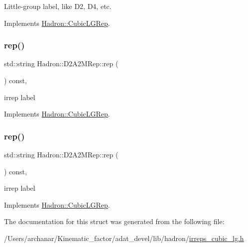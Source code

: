 Little-\/group label, like D2, D4, etc. 

Implements \mbox{\hyperlink{structHadron_1_1CubicLGRep_a9bdb14b519a611d21379ed96a3a9eb41}{Hadron\+::\+Cubic\+L\+G\+Rep}}.

\mbox{\label{structHadron_1_1D2A2MRep_af770f75006ed187caad6a1bf3df3e64e}} 
\subsubsection{\texorpdfstring{rep()}{rep()}\hspace{0.1cm}{\footnotesize\ttfamily [1/2]}}
{\footnotesize\ttfamily std\+::string Hadron\+::\+D2\+A2\+M\+Rep\+::rep (\begin{DoxyParamCaption}{ }\end{DoxyParamCaption}) const\hspace{0.3cm}{\ttfamily [inline]}, {\ttfamily [virtual]}}

irrep label 

Implements \mbox{\hyperlink{structHadron_1_1CubicLGRep_a50f5ddbb8f4be4cee0106fa9e8c75e6c}{Hadron\+::\+Cubic\+L\+G\+Rep}}.

\mbox{\label{structHadron_1_1D2A2MRep_af770f75006ed187caad6a1bf3df3e64e}} 
\subsubsection{\texorpdfstring{rep()}{rep()}\hspace{0.1cm}{\footnotesize\ttfamily [2/2]}}
{\footnotesize\ttfamily std\+::string Hadron\+::\+D2\+A2\+M\+Rep\+::rep (\begin{DoxyParamCaption}{ }\end{DoxyParamCaption}) const\hspace{0.3cm}{\ttfamily [inline]}, {\ttfamily [virtual]}}

irrep label 

Implements \mbox{\hyperlink{structHadron_1_1CubicLGRep_a50f5ddbb8f4be4cee0106fa9e8c75e6c}{Hadron\+::\+Cubic\+L\+G\+Rep}}.



The documentation for this struct was generated from the following file\+:\begin{DoxyCompactItemize}
\item 
/\+Users/archanar/\+Kinematic\+\_\+factor/adat\+\_\+devel/lib/hadron/\mbox{\hyperlink{lib_2hadron_2irreps__cubic__lg_8h}{irreps\+\_\+cubic\+\_\+lg.\+h}}\end{DoxyCompactItemize}

